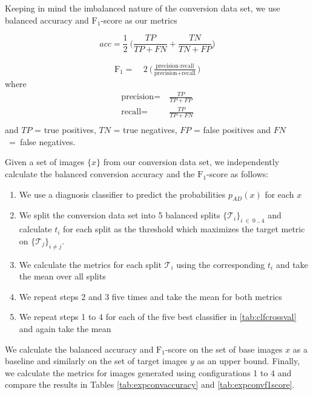 Keeping in mind the imbalanced nature of the conversion data set, we use balanced accuracy and $\text{F}_1$-score as our metrics

\begin{equation}
	acc = \frac{1}{2}\ \bigg(\frac{TP}{TP + FN} + \frac{TN}{TN + FP}\bigg)
\end{equation}

\begin{equation}
	\begin{split}
		\text{F}_1 =&\ 2\ \bigg(\frac{\text{precision} \cdot \text{recall}}{\text{precision} + \text{recall}}\bigg)
	\end{split}
\end{equation}
where
\begin{equation*}
	\begin{split}
	\text{precision} =& \ \frac{TP}{TP + FP} \\[8pt]
		\text{recall} =& \ \frac{TP}{TP + FN} \\[8pt]
	\end{split}
\end{equation*}
and $TP$ = true positives, $TN$ = true negatives, $FP$ = false positives and $FN$~=~false negatives.

Given a set of images $\{x\}$ from our conversion data set, we independently calculate the balanced conversion accuracy and the $\text{F}_1$-score as follows:
\begin{enumerate}
	\item We use a diagnosis classifier to predict the probabilities $p_{AD}(x)$ for each $x$
	\item We split the conversion data set into 5 balanced splits $\{\mathcal{T}_i\}_{i\ \in\ 0\ ..\ 4}$ and calculate $t_i$ for each split as the threshold which maximizes the target metric on $\{\mathcal{T}_j\}_{i \neq j}$.
	\item We calculate the metrics for each split $\mathcal{T}_i$ using the corresponding $t_i$ and take the mean over all splits
	\item We repeat steps 2 and 3 five times and take the mean for both metrics
	\item We repeat steps 1 to 4 for each of the five best classifier in \autoref{tab:clfcrossval} and again take the mean
\end{enumerate}

We calculate the balanced accuracy and $\text{F}_1$-score on the set of base images $x$ as a baseline and similarly on the set of target images $y$ as an upper bound. Finally, we calculate the metrics for images generated using configurations 1 to 4 and compare the results in Tables \ref{tab:expconvaccuracy} and \ref{tab:expconvf1score}.

